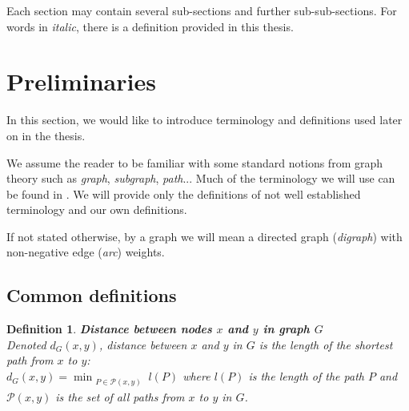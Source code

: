 \documentclass[a4paper]{article}
\newtheorem{definition}{Definition}
\begin{document}
        \noindent Each section may contain several sub-sections and further sub-sub-sections. For words in \emph{italic}, there is a definition provided in this thesis.

    \pagebreak


    \section{Preliminaries}
    \label{sec:preliminaries}
    In this section, we would like to introduce terminology and definitions used later on in the thesis.

    We assume the reader to be familiar with some standard notions from graph theory such as \emph{graph}, \emph{subgraph}, \emph{path}... Much of the terminology we will use can be found in \cite{sommerthesis10}. We will provide only the definitions of not well established terminology and our own definitions.

    If not stated otherwise, by a graph we will mean a directed graph (\emph{digraph}) with non-negative edge (\emph{arc}) weights.

        \subsection{Common definitions}
        \begin{definition}
            \textbf{Distance between nodes $x$ and $y$ in graph $G$} \\
            Denoted $d_{G}(x, y)$, distance between $x$ and $y$ in $G$ is the length of the shortest path from $x$ to $y$: \\
            $\displaystyle d_{G}(x, y) = \min_{\substack{P \in \mathcal{P}(x, y)}} l(P)$
            where $l(P)$ is the length of the path $P$ and $\mathcal{P}(x, y)$ is the set of all paths from $x$ to $y$ in $G$.
        \end{definition}
\end{document}
